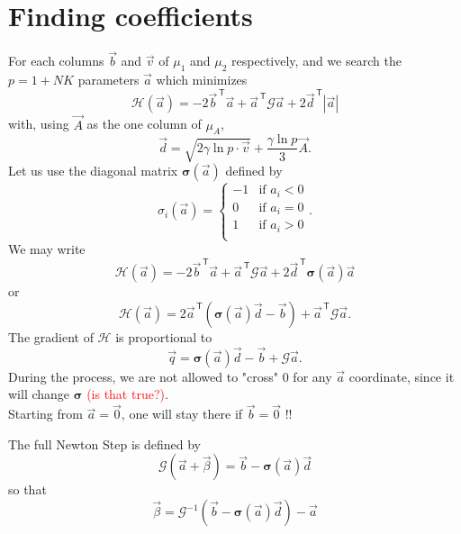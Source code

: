 \documentclass{revtex4}
\newcommand{\abs}[1]{\left|#1\right|}
\newcommand{\trn}[1]{{#1}^{\,\mathsf{T}}}
\begin{document}
\section{Finding coefficients}
For each columns $\vec{b}$ and $\vec{v}$ of $\mu_1$ and $\mu_2$ respectively, and we search the $p=1+NK$ parameters $\vec{a}$ which minimizes
\begin{equation}
	\mathcal{H}\left(\vec{a}\right) = -2\trn{\vec{b}}\vec{a} + \trn{\vec{a}} \mathcal{G} \vec{a} +2 \trn{\vec{d}} \abs{\vec{a}}
\end{equation}
with, using $\vec{A}$ as the one column of $\mu_A$, 
\begin{equation}
	\vec{d} = \sqrt{2\gamma \ln p \cdot \vec{v}} + \dfrac{\gamma\ln p}{3} \vec{A}. 
\end{equation}
Let us use the diagonal matrix 
$\bm{\sigma}\left(\vec{a}\right)$ defined by
\begin{equation}
	\sigma_{i}\left({\vec{a}}\right) = \left\lbrace
	\begin{array}{rl}
	-1 & \text{if $a_i<0$}\\
	0  & \text{if $a_i=0$}\\
	1  & \text{if $a_i>0$}\\
	\end{array}
	\right.
	.
\end{equation}
We may write
\begin{equation}
	\mathcal{H}\left(\vec{a}\right) = -2\trn{\vec{b}}\vec{a} + \trn{\vec{a}} \mathcal{G} \vec{a} + 2 \trn{\vec{d}} \bm{\sigma}\left(\vec{a}\right) \vec{a}
\end{equation}
or
\begin{equation}
	\mathcal{H}\left(\vec{a}\right) = 2\trn{\vec{a}}\left(\bm{\sigma}\left({\vec{a}}\right)\vec{d}-\vec{b}\right) +  \trn{\vec{a}} \mathcal{G} \vec{a}.
\end{equation}
The gradient of
  $\mathcal{H}$  is proportional to
\begin{equation}
	\vec{q} = \bm{\sigma}\left({\vec{a}}\right) \vec{d} -\vec{b} + \mathcal{G} \vec{a}.
\end{equation}
During the process, we are not allowed to "cross" $0$ for any $\vec{a}$ coordinate, since it will change $\bm{\sigma}$ \textcolor{red}{(is that true?)}.\\
Starting from $\vec{a}=\vec{0}$, one will stay there if $\vec{b}=\vec{0}$ !!
 
The full Newton Step is defined by
\begin{equation}
	\mathcal{G}\left(\vec{a}+\vec{\beta}\right)   = \vec{b} - \bm{\sigma}\left({\vec{a}}\right) \vec{d}
\end{equation}
so that
\begin{equation}
	\vec{\beta} = \mathcal{G}^{-1} \left( \vec{b} - \bm{\sigma}\left({\vec{a}}\right) \vec{d} \right) - \vec{a}
\end{equation}
\end{document}

